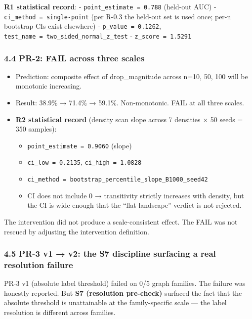 \documentclass[
]{article}
\providecommand{\tightlist}{%
  \setlength{\itemsep}{0pt}\setlength{\parskip}{0pt}}
\begin{document}
\textbf{R1 statistical record}: - \texttt{point\_estimate\ =\ 0.788}
(held-out AUC) - \texttt{ci\_method\ =\ single-point} (per R-0.3 the
held-out set is used once; per-n bootstrap CIs exist elsewhere) -
\texttt{p\_value\ =\ 0.1262},
\texttt{test\_name\ =\ two\_sided\_normal\_z\_test} -
\texttt{z\_score\ =\ 1.5291}

\subsubsection{4.4 PR-2: FAIL across three
scales}\label{pr-2-fail-across-three-scales}

\begin{itemize}
\tightlist
\item
  Prediction: composite effect of drop\_magnitude across n=10, 50, 100
  will be monotonic increasing.
\item
  Result: 38.9\% → 71.4\% → 59.1\%. Non-monotonic. FAIL at all three
  scales.
\item
  \textbf{R2 statistical record} (density scan slope across 7 densities
  × 50 seeds = 350 samples):

  \begin{itemize}
  \tightlist
  \item
    \texttt{point\_estimate\ =\ 0.9060} (slope)
  \item
    \texttt{ci\_low\ =\ 0.2135}, \texttt{ci\_high\ =\ 1.0828}
  \item
    \texttt{ci\_method\ =\ bootstrap\_percentile\_slope\_B1000\_seed42}
  \item
    CI does not include 0 → transitivity strictly increases with
    density, but the CI is wide enough that the ``flat landscape''
    verdict is not rejected.
  \end{itemize}
\end{itemize}

The intervention did not produce a scale-consistent effect. The FAIL was
not rescued by adjusting the intervention definition.

\subsubsection{4.5 PR-3 v1 → v2: the S7 discipline surfacing a real
resolution
failure}\label{pr-3-v1-v2-the-s7-discipline-surfacing-a-real-resolution-failure}

PR-3 v1 (absolute label threshold) failed on 0/5 graph families. The
failure was honestly reported. But \textbf{S7 (resolution pre-check)}
surfaced the fact that the absolute threshold is unattainable at the
family-specific scale --- the label resolution is different across
families.
\end{document}
